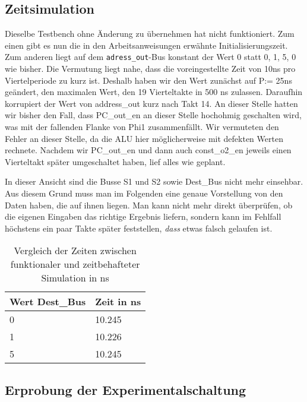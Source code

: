 \documentclass[12pt,a4paper]{scrartcl}
\begin{document}
\subsection{Zeitsimulation}
Dieselbe Testbench ohne \"Anderung zu \"ubernehmen hat nicht funktioniert.
Zum einen gibt es nun die in den Arbeitsanweisungen erw\"ahnte Initialisierungszeit.
Zum anderen liegt auf dem \texttt{adress\_out}-Bus konstant der Wert 0 statt 0, 1, 5, 0 wie bisher.
Die Vermutung liegt nahe, dass die voreingestellte Zeit von 10ns pro Viertelperiode zu kurz ist.
Deshalb haben wir den Wert zun\"achst auf P:= 25ns ge\"andert, den maximalen Wert, den 19 Vierteltakte in 500 ns zulassen.
Daraufhin korrupiert der Wert von address\_out kurz nach Takt 14.
An dieser Stelle hatten wir bisher den Fall, dass PC\_out\_en an dieser Stelle hochohmig geschalten wird, was mit der fallenden Flanke von Phi1 zusammenf\"allt.
Wir vermuteten den Fehler an dieser Stelle, da die ALU hier m\"oglicherweise mit defekten Werten rechnete.
Nachdem wir PC\_out\_en und dann auch const\_o2\_en jeweils einen Vierteltakt sp\"ater umgeschaltet haben, lief alles wie geplant.

In dieser Ansicht sind die Busse S1 und S2 sowie Dest\_Bus nicht mehr einsehbar.
Aus diesem Grund muss man im Folgenden eine genaue Vorstellung von den Daten haben, die auf ihnen liegen.
Man kann nicht mehr direkt \"uberpr\"ufen, ob die eigenen Eingaben das richtige Ergebnis liefern, sondern kann im Fehlfall h\"ochstens ein paar Takte sp\"ater feststellen, \emph{dass} etwas falsch gelaufen ist.

\begin{table}[h]
    \centering
    \begin{tabular}{l|l}
    \hline
    Wert Dest\_Bus & Zeit in ns \\
    \hline
    0              & 10.245     \\ %
    1              & 10.226     \\ %
    5              & 10.245     \\ %
    \hline
    \end{tabular}
    \caption{Vergleich der Zeiten zwischen funktionaler und zeitbehafteter Simulation in ns}
    \label{vergleich}
\end{table}

\subsection{Erprobung der Experimentalschaltung}
\end{document}
